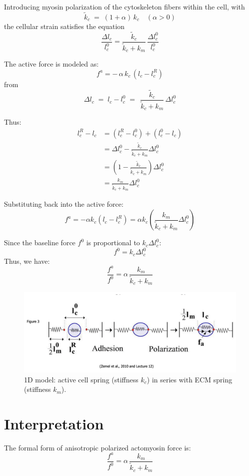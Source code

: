 \documentclass{article}
\begin{document}
Introducing myosin polarization of the cytoskeleton fibers within the cell,  with 
\[
  \tilde{k}_c \;=\; (1 + \alpha)\,k_c \quad (\alpha>0)
\]
the cellular strain satisfies the equation
\[
  \frac{\Delta l_c}{l_c^0}
  = \frac{\tilde{k}_c}{\tilde{k}_c + k_m}\,\frac{\Delta l_c^0}{l_c^0}
\]

The active force is modeled as:
\[
  f^a = -\,\alpha\,k_c\,(l_c - l_c^R)
\]
from
\[
  \Delta l_c \;=\; l_c - l_c^0 \;=\; \,\frac{\tilde{k}_c}{\tilde{k}_c + k_m} \,\Delta l_c^0
\]

Thus:
\begin{align*}
l_c^R - l_c &= (l_c^R - l_c^0) + (l_c^0 - l_c) \\
&= \Delta l_c^0 - \frac{\tilde{k}_c}{\tilde{k}_c + k_m} \Delta l_c^0 \\
&= \left(1 - \frac{\tilde{k}_c}{\tilde{k}_c + k_m} \right) \Delta l_c^0 \\
&= \frac{k_m}{\tilde{k}_c + k_m} \Delta l_c^0
\end{align*}

Substituting back into the active force:
\[
f^a = -\alpha k_c (l_c - l_c^R) = \alpha k_c \left( \frac{k_m}{\tilde{k}_c + k_m} \Delta l_c^0 \right)
\]

Since the baseline force \(f^0\) is proportional to \(k_c \Delta l_c^0\):
\[
f^0 = k_c \Delta l_c^0
\]
Thus, we have:
\[
\boxed{
\frac{f^a}{f^0} = \alpha \, \frac{k_m}{\tilde{k}_c + k_m}
}
\]

\begin{figure}[h!]
  \centering
  \includegraphics[width=1\textwidth]{springs}
  \caption{1D model: active cell spring (stiffness \(k_c\)) in series with 
  ECM spring (stiffness \(k_m\)).}
  \label{fig:1d-spring-model}
\end{figure}

\section*{Interpretation}

The formal form of anisotropic polarized actomyosin force is:
\[
  \frac{f^{a}}{f^{0}}
  = \alpha \,\frac{k_{m}}{\tilde{k}_{c} + k_{m}}
\]
\end{document}
